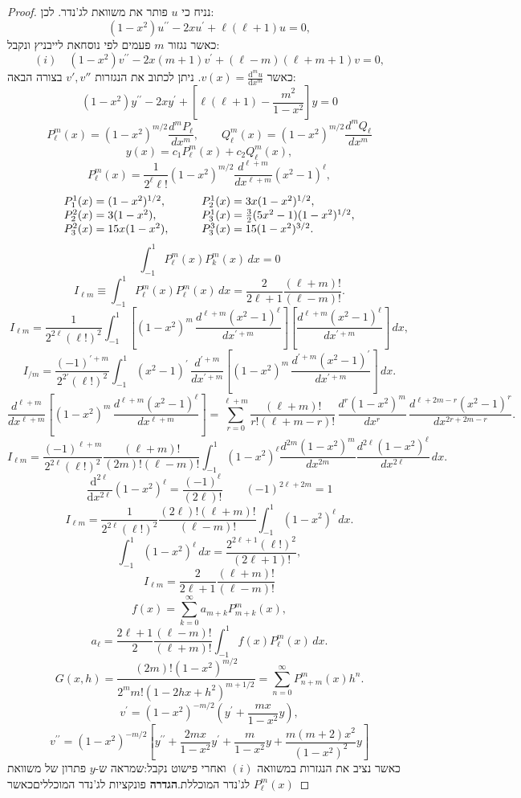 \documentclass{tstextbook}
\begin{document}
\begin{proof}
נניח כי \(u\) פותר את משוואת לג'נדר. לכן:
$$(1-x^{2})u^{\prime\prime}-2x u^{\prime}+\ell(\ell+1)u=0,$$
כאשר נגזור \(m\) פעמים לפי נוסחאת לייבניץ ונקבל:
$$(i)\quad (1-x^{2})v^{\prime\prime}-2x(m+1)v^{\prime}+\left( \ell-m \right)\left( \ell+m+1 \right)v=0,$$
כאשר \(v(x)=\frac{\mathrm{d} ^{m}u}{\mathrm{d} x^{m}}\). ניתן לכתוב את הנגזרות \(v',v''\) בצורה הבאה:
$$(1-x^{2})y^{\prime\prime}-2x y^{\prime}+\left[\ell(\ell+1)-\frac{m^{2}}{1-x^{2}}\right]y=0$$$$P_{\ell}^{m}(x)=(1-x^{2})^{m/2}\frac{d^{m}P_{\ell}}{d x^{m}},\qquad Q_{\ell}^{m}(x)=(1-x^{2})^{m/2}\frac{d^{m}Q_{\ell}}{d x^{m}}$$$$y(x)=c_{1}P_{\ell}^{m}(x)+c_{2}Q_{\ell}^{m}(x),$$$$P_{\ell}^{m}(x)=\frac{1}{2^{\ell}\ell!}(1-x^{2})^{m/2}\frac{d^{\ell+m}}{d x^{\ell+m}}(x^{2}-1)^{\ell},$$$$\begin{array}{l l}{{P_{1}^{1}(x)=(1-x^{2})^{1/2},}}&{{\qquad P_{2}^{1}(x)=3x(1-x^{2})^{1/2},}}\\ {{P_{2}^{2}(x)=3(1-x^{2}),}}&{{\qquad P_{3}^{1}(x)=\frac{3}{2}(5x^{2}-1)(1-x^{2})^{1/2},}}\\ {{P_{3}^{2}(x)=15x(1-x^{2}),}}&{{\qquad P_{3}^{3}(x)=15(1-x^{2})^{3/2}.}}\end{array}$$$$\int_{-1}^{1}P_{\ell}^{m}(x)P_{k}^{m}(x)\,d x=0$$$$I_{\ell m}\equiv\int_{-1}^{1}P_{\ell}^{m}(x)P_{\ell}^{m}(x)\,d x=\frac{2}{2\ell+1}\frac{(\ell+m)!}{(\ell-m)!}.$$$$I_{\ell m}=\frac{1}{2^{2\ell}(\ell!)^{2}}\int_{-1}^{1}\left[(1-x^{2})^{m}\,\frac{d^{\ell+m}(x^{2}-1)^{\ell}}{d x^{\prime+m}}\right]\left[\frac{d^{\ell+m}(x^{2}-1)^{\ell}}{d x^{\prime+m}}\right]\,d x,$$$$I_{/m}=\frac{(-1)^{\prime+m}}{2^{2\prime}(\ell!)^{2}}\int_{-1}^{1}(x^{2}-1)^{\prime}\,\frac{d^{\prime+m}}{d x^{\prime+m}}\left[(1-x^{2})^{m}\,\frac{d^{\prime+m}(x^{2}-1)^{\prime}}{d x^{\prime+m}}\right]\,d x.$$$$\frac{d^{\ell+m}}{d x^{\ell+m}}\left[(1-x^{2})^{m}\,\frac{d^{\ell+m}(x^{2}-1)^{\ell}}{d x^{\ell+m}}\right]=\sum_{r=0}^{\ell+m}\frac{(\ell+m)!}{r!(\ell+m-r)!}\,\frac{d^{r}(1-x^{2})^{m}}{d x^{r}}\,\frac{d^{\ell+2m-r}(x^{2}-1)^{r}}{d x^{2r+2m-r}}.$$$$I_{\ell m}=\frac{(-1)^{\ell+m}}{2^{2\ell}(\ell!)^{2}}\frac{(\ell+m)!}{(2m)!(\ell-m)!}\int_{-1}^{1}(1-x^{2})^{\ell}\frac{d^{2m}(1-x^{2})^{m}}{d x^{2m}}\frac{d^{2\ell}(1-x^{2})^{\ell}}{d x^{2\ell}}\,d x.$$$$\frac{\mathrm{d} ^{2\ell}}{\mathrm{d} x^{2\ell}} (1-x^{2})^{\ell}=\frac{(-1)^{\ell}}{\left( 2\ell \right)!}\qquad (-1)^{2\ell+2m}=1$$$$I_{\ell m}=\frac{1}{2^{2\ell}(\ell!)^{2}}\frac{(2\ell)!(\ell+m)!}{(\ell-m)!}\int_{-1}^{1}(1-x^{2})^{\ell}\,d x.$$$$\int_{-1}^{1}(1-x^{2})^{\ell}\,d x=\frac{2^{2\ell+1}(\ell!)^{2}}{(2\ell+1)!},$$$$I_{\ell m}=\frac{2}{2\ell+1}\frac{(\ell+m)!}{(\ell-m)!}$$$$f(x)=\sum_{k=0}^{\infty}a_{m+k}P_{m+k}^{m}(x),$$$$a_{\ell}=\frac{2\ell+1}{2}\frac{(\ell-m)!}{(\ell+m)!}\int_{-1}^{1}f(x)P_{\ell}^{m}(x)\,d x.$$$$G(x,h)=\frac{(2m)!(1-x^{2})^{m/2}}{2^{m}m!(1-2h x+h^{2})^{m+1/2}}=\sum_{n=0}^{\infty}P_{n+m}^{m}(x)h^{n}.$$$$v^{\prime}=(1-x^{2})^{-m/2}\left(y^{\prime}+\frac{m x}{1-x^{2}}y\right),$$$$v^{\prime\prime}=(1-x^{2})^{-m/2}\left[y^{\prime\prime}+\frac{2m x}{1-x^{2}}y^{\prime}+\frac{m}{1-x^{2}}y+\frac{m(m+2)x^{2}}{(1-x^{2})^{2}}y\right]$$כאשר נציב את הנגזרות במשוואה \((i)\) ואחרי פישוט נקבל:שמראה ש-\(y\) פתרון של משוואת לג'נדר המוכללת.\textbf{הגדרה} פונקציות לג'נדר המוכלליםכאשר \(P^{m}_{\ell}(x)\) 
\end{proof}
\end{document}
